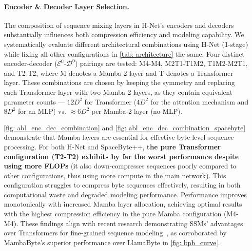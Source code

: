 \documentclass{article}
\newcommand{\citep}{\parencite}
\newcommand{\model}{H-Net}
\newcommand{\main}{main network}
\newcommand{\onestage}{1-stage}
\theoremstyle{plain}
\theoremstyle{remark}
\begin{document}
\paragraph{Encoder \& Decoder Layer Selection.}
The composition of sequence mixing layers in H-Net's encoders and decoders substantially influences both compression efficiency and modeling capability.
We systematically evaluate different architectural combinations using \model{} (\onestage{}) while fixing all other configurations in \cref{tab: architecture} the same.
Four distinct encoder-decoder ($\mathcal{E}^0$-$\mathcal{D}^0$) pairings are tested: M4-M4, M2T1-T1M2, T1M2-M2T1, and T2-T2, where M denotes a Mamba-2 layer and T denotes a Transformer layer.
These combinations are chosen by keeping the symmetry and replacing each Transformer layer with two Mamba-2 layers, as they contain equivalent parameter counts --- $12D^2$ for Transformer ($4D^2$ for the attention mechanism and $8D^2$ for an MLP) vs. $\approx 6D^2$ per Mamba-2 layer (no MLP).

\cref{fig: abl_enc_dec_combination} and \cref{fig: abl_enc_dec_combination_spacebyte} demonstrate that Mamba layers are essential for effective byte-level sequence processing.
For both \model{} and SpaceByte++, \textbf{the pure Transformer configuration (T2-T2) exhibits by far the worst performance despite using more FLOPs} (it also down-compresses sequences poorly compared to other configurations, thus using more compute in the \main{}).
This configuration struggles to compress byte sequences effectively, resulting in both computational waste and degraded modeling performance.
Performance improves monotonically with increased Mamba layer allocation, achieving optimal results with the highest compression efficiency in the pure Mamba configuration (M4-M4).
These findings align with recent research demonstrating SSMs' advantages over Transformers for fine-grained sequence modeling~\citep{SaShiMi, Caduceus}, as corroborated by MambaByte's superior performance over LlamaByte in \cref{fig: bpb_curve}.
\end{document}
